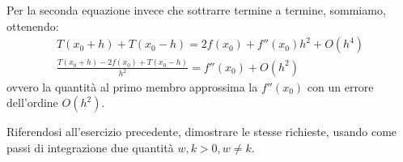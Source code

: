 Per la seconda equazione invece che sottrarre termine a termine, sommiamo,
ottenendo:
\begin{equation*}
	\begin{split}
		T(x_{0}+h) + T(x_{0}-h) = 2f(x_{0}) + f''(x_{0})h^{2} + O(h^{4})\\
		\frac{T(x_{0}+h) - 2f(x_{0}) + T(x_{0}-h)}{h^{2}} = f''(x_{0}) + O(h^{2}) 
	\end{split}
\end{equation*}
ovvero la quantit\`a al primo membro approssima la $f''(x_{0})$ con un errore 
dell'ordine $O(h^{2})$.

\begin{exercise}
	Riferendosi all'esercizio precedente, dimostrare le stesse richieste, usando 
	come passi di integrazione due quantit\`a $w, k > 0, w \not = k$.
\end{exercise}
